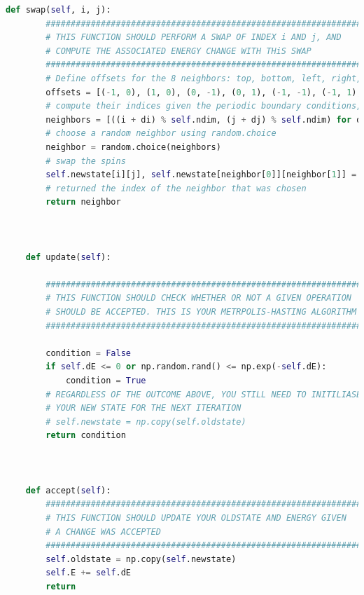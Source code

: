 \documentclass[12pt]{article}
\begin{document}
\begin{lstlisting}[language=Python]
    def swap(self, i, j):
        ################################################################
        # THIS FUNCTION SHOULD PERFORM A SWAP OF INDEX i AND j, AND    #
        # COMPUTE THE ASSOCIATED ENERGY CHANGE WITH THiS SWAP          #
        ################################################################
        # Define offsets for the 8 neighbors: top, bottom, left, right, and the 4 diagonals
        offsets = [(-1, 0), (1, 0), (0, -1), (0, 1), (-1, -1), (-1, 1), (1, -1), (1, 1)]
        # compute their indices given the periodic boundary conditions, which means taking mod self.ndim
        neighbors = [((i + di) % self.ndim, (j + dj) % self.ndim) for di, dj in offsets]
        # choose a random neighbor using random.choice
        neighbor = random.choice(neighbors)
        # swap the spins
        self.newstate[i][j], self.newstate[neighbor[0]][neighbor[1]] = self.newstate[neighbor[0]][neighbor[1]], self.newstate[i][j]
        # returned the index of the neighbor that was chosen
        return neighbor


    
    def update(self):

        ################################################################
        # THIS FUNCTION SHOULD CHECK WHETHER OR NOT A GIVEN OPERATION  #
        # SHOULD BE ACCEPTED. THIS IS YOUR METRPOLIS-HASTING ALGORITHM #
        ################################################################
        
        condition = False
        if self.dE <= 0 or np.random.rand() <= np.exp(-self.dE):
            condition = True
        # REGARDLESS OF THE OUTCOME ABOVE, YOU STILL NEED TO INITILIASE
        # YOUR NEW STATE FOR THE NEXT ITERATION
        # self.newstate = np.copy(self.oldstate)
        return condition
        


    def accept(self):
        ################################################################
        # THIS FUNCTION SHOULD UPDATE YOUR OLDSTATE AND ENERGY GIVEN   #
        # A CHANGE WAS ACCEPTED                                        $
        ################################################################
        self.oldstate = np.copy(self.newstate)
        self.E += self.dE
        return



\end{lstlisting}
\end{document}
